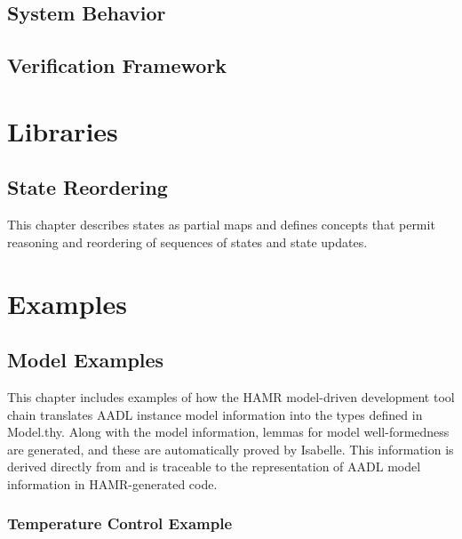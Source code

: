\documentclass[10pt,oneside]{book}
\begin{document}


\chapter{System Behavior}



\chapter{Verification Framework}




\part{Libraries}

\chapter{State Reordering}

This chapter describes states as partial maps and defines concepts that permit
reasoning and reordering of sequences of states and state updates.




\part{Examples}

\chapter{Model Examples}

This chapter includes examples of how the HAMR model-driven
development tool chain translates AADL instance model information into
the types defined in Model.thy.   Along with the model information,
lemmas for model well-formedness are generated, and these are
automatically proved by Isabelle.   This information is derived
directly from and is traceable to the representation of AADL model
information in HAMR-generated code.

\section{Temperature Control Example}




\end{document}
